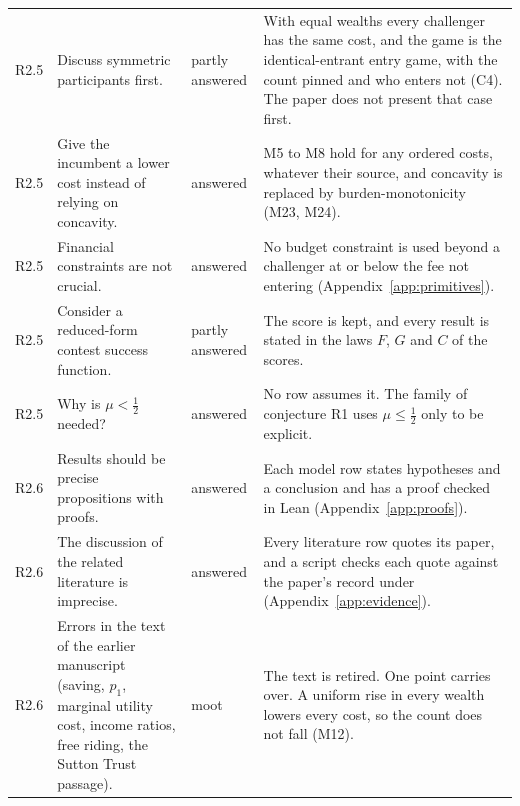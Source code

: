 \begin{longtable}{@{}P{1.3cm}P{5.7cm}P{1.9cm}P{7.0cm}@{}}
R2.5 & Discuss symmetric participants first. & partly answered & With equal
  wealths every challenger has the same cost, and the game is the
  identical-entrant entry game, with the count pinned and who enters not
  (C4). The paper does not present that case first. \\
R2.5 & Give the incumbent a lower cost instead of relying on concavity. &
  answered & M5 to M8 hold for any ordered costs, whatever their source, and
  concavity is replaced by burden-monotonicity (M23, M24). \\
R2.5 & Financial constraints are not crucial. & answered & No budget
  constraint is used beyond a challenger at or below the fee not entering
  (Appendix~\ref{app:primitives}). \\
R2.5 & Consider a reduced-form contest success function. & partly answered &
  The score is kept, and every result is stated in the laws $F$, $G$ and $C$
  of the scores. \\
R2.5 & Why is $\mu<\tfrac12$ needed? & answered & No row assumes it. The
  family of conjecture R1 uses $\mu\le\tfrac12$ only to be explicit. \\
R2.6 & Results should be precise propositions with proofs. & answered & Each
  model row states hypotheses and a conclusion and has a proof checked in
  Lean (Appendix~\ref{app:proofs}). \\
R2.6 & The discussion of the related literature is imprecise. & answered &
  Every literature row quotes its paper, and a script checks each quote
  against the paper's record under  (Appendix~\ref{app:evidence}). \\
R2.6 & Errors in the text of the earlier manuscript (saving, $p_1$,
  marginal utility cost, income ratios, free riding, the Sutton Trust
  passage). & moot & The text is retired. One point carries over. A uniform
  rise in every wealth lowers every cost, so the count does not fall (M12). \\
\end{longtable}
\normalsize





